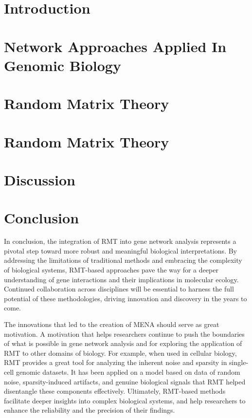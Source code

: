 \documentclass[leqno]{article}[12pt]
\begin{document}
\section{Introduction}\label{sec:introduction}


\section{Network Approaches Applied In Genomic Biology}\label{sec:network-approaches-applied-in-genomic-biology}


\section{Random Matrix Theory}\label{sec:random-matrix-theory}


\section{Random Matrix Theory}\label{sec:molecular-ecological-network-analysis}


\section{Discussion}\label{sec:discussion}


\section{Conclusion}\label{sec:conclusion}
In conclusion, the integration of RMT into gene network analysis represents a pivotal step toward more robust and meaningful biological interpretations.
By addressing the limitations of traditional methods and embracing the complexity of biological systems, RMT-based approaches pave the way for a deeper understanding of gene interactions and their implications in molecular ecology.
Continued collaboration across disciplines will be essential to harness the full potential of these methodologies, driving innovation and discovery in the years to come.

\noindent The innovations that led to the creation of MENA should serve as great motivation.
A motivation that helps researchers continue to push the boundaries of what is possible in gene network analysis and for exploring the application of RMT to other domains of biology.
For example, when used in cellular biology, RMT provides a great tool for analyzing the inherent noise and sparsity in single-cell genomic datasets.
It has been applied on a model based on data of random noise, sparsity-induced artifacts, and genuine biological signals that RMT helped disentangle these components effectively.
Ultimately, RMT-based methods facilitate deeper insights into complex biological systems, and help researchers to enhance the reliability and the precision of their findings.
\end{document}
